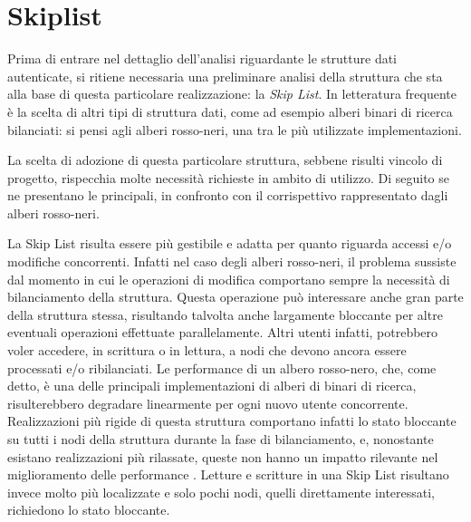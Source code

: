 	
\section{Skiplist}

%

	Prima di entrare nel dettaglio dell'analisi riguardante le strutture dati autenticate, si ritiene necessaria una preliminare analisi della struttura che sta alla base di questa particolare realizzazione: la \textit{Skip List}. In letteratura frequente è la scelta di altri tipi di struttura dati, come ad esempio alberi binari di ricerca bilanciati: si pensi agli alberi rosso-neri, una tra le più utilizzate implementazioni.
	
	La scelta di adozione di questa particolare struttura, sebbene risulti vincolo di progetto, rispecchia molte necessità richieste in ambito di utilizzo. Di seguito se ne presentano le principali, in confronto con il corrispettivo rappresentato dagli alberi rosso-neri.
	
	La Skip List risulta essere più gestibile e adatta per quanto riguarda accessi e/o modifiche concorrenti. Infatti nel caso degli alberi rosso-neri, il problema sussiste dal momento in cui le operazioni di modifica comportano sempre la necessità di bilanciamento della struttura. Questa operazione può interessare anche gran parte della struttura stessa, risultando talvolta anche largamente bloccante per altre eventuali operazioni effettuate parallelamente. Altri utenti infatti, potrebbero voler accedere, in scrittura o in lettura, a nodi che devono ancora essere processati e/o ribilanciati. Le performance di un albero rosso-nero, che, come detto, è una delle principali implementazioni di alberi di binari di ricerca, risulterebbero degradare linearmente per ogni nuovo utente concorrente. Realizzazioni più rigide di questa struttura comportano infatti lo stato bloccante su tutti i nodi della struttura durante la fase di bilanciamento, e, nonostante esistano realizzazioni più rilassate, queste non hanno un impatto rilevante nel miglioramento delle performance \cite{blocking_datastructures}.
	Letture e scritture in una Skip List risultano invece molto più localizzate e solo pochi nodi, quelli direttamente interessati, richiedono lo stato bloccante.
	
